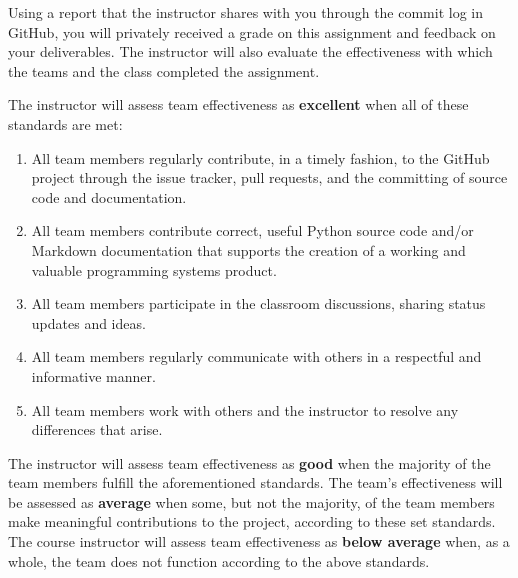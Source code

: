 \documentclass[11pt]{article}
\begin{document}
Using a report that the instructor shares with you through the commit log in GitHub, you will privately received a grade
on this assignment and feedback on your deliverables. The instructor will also evaluate the effectiveness with which the
teams and the class completed the assignment.

The instructor will assess team effectiveness as {\bf excellent} when all of these standards are met:

\vspace*{-.5em}

\begin{enumerate}
  \setlength{\itemsep}{0pt}

  \item All team members regularly contribute, in a timely fashion, to the GitHub project through the issue tracker,
    pull requests, and the committing of source code and documentation.

  \item All team members contribute correct, useful Python source code and/or Markdown documentation that supports the
    creation of a working and valuable programming systems product.

  \item All team members participate in the classroom discussions, sharing status updates and ideas.

  \item All team members regularly communicate with others in a respectful and informative manner.

  \item All team members work with others and the instructor to resolve any differences that arise.

\end{enumerate}

\vspace*{-.5em}

The instructor will assess team effectiveness as {\bf good} when the majority of the team members fulfill the
aforementioned standards. The team's effectiveness will be assessed as {\bf average} when some, but not the majority, of
the team members make meaningful contributions to the project, according to these set standards. The course instructor
will assess team effectiveness as {\bf below average} when, as a whole, the team does not function according to the
above standards.
\end{document}

